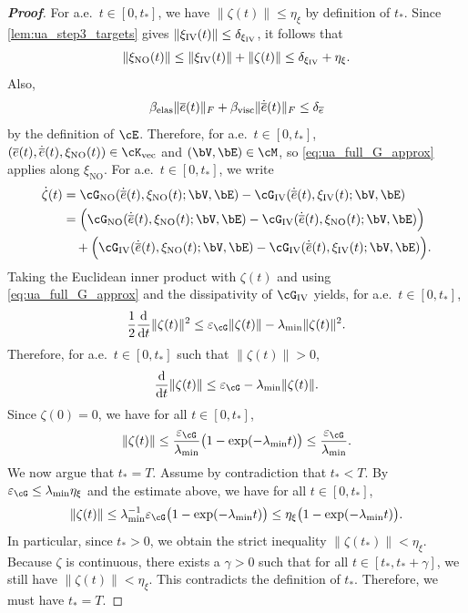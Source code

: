 \begin{proof}[\bf Proof]
For a.e.\ $t\in[0,t_*]$, we have $\|\zeta(t)\|\le \eta_{\xi}$ by definition of $t_*$. Since \cref{lem:ua_step3_targets} gives $\|\xi_{\mathrm{IV}}(t)\|\le \delta_{\xi_{\rm IV}}$, it follows that
\begin{equation*}
\|\xi_{\mathrm{NO}}(t)\|\le \|\xi_{\mathrm{IV}}(t)\|+\|\zeta(t)\|\le \delta_{\xi_{\rm IV}}+\eta_{\xi}.
\end{equation*}
Also,
\begin{equation*}
\beta_{\rm elas}\|\overline e(t)\|_F+\beta_{\rm visc}\|\dot{\overline e}(t)\|_F\le \delta_{\overline e}
\end{equation*}
by the definition of $\cE$. Therefore, for a.e.\ $t\in[0,t_*]$,
$(\overline e(t),\dot{\overline e}(t),\xi_{\mathrm{NO}}(t))\in\cK_{\mathrm{vec}}$ and $(\bV,\bE)\in\cM$, so \cref{eq:ua_full_G_approx} applies along $\xi_{\mathrm{NO}}$.
For a.e.\ $t\in[0,t_*]$, we write
\begin{align*}
\dot\zeta(t)
&=
\cG_{\mathrm{NO}}(\dot{\overline e}(t),\xi_{\mathrm{NO}}(t);\bV,\bE)
-\cG_{\mathrm{IV}}(\dot{\overline e}(t),\xi_{\mathrm{IV}}(t);\bV,\bE)\\
&=
\Big(\cG_{\mathrm{NO}}(\dot{\overline e}(t),\xi_{\mathrm{NO}}(t);\bV,\bE)
-\cG_{\mathrm{IV}}(\dot{\overline e}(t),\xi_{\mathrm{NO}}(t);\bV,\bE)\Big)\\
&\quad+
\Big(\cG_{\mathrm{IV}}(\dot{\overline e}(t),\xi_{\mathrm{NO}}(t);\bV,\bE)
-\cG_{\mathrm{IV}}(\dot{\overline e}(t),\xi_{\mathrm{IV}}(t);\bV,\bE)\Big).
\end{align*}
Taking the Euclidean inner product with $\zeta(t)$ and using \cref{eq:ua_full_G_approx} and the dissipativity of $\cG_{\mathrm{IV}}$ yields, for a.e.\ $t\in[0,t_*]$,
\begin{equation*}
\frac{1}{2}\frac{\mathrm{d}}{\mathrm{d}t}\|\zeta(t)\|^2
\le \varepsilon_{\cG}\|\zeta(t)\| - \lambda_{\min}\|\zeta(t)\|^2.
\end{equation*}
Therefore, for a.e.\ $t\in[0,t_*]$ such that $\|\zeta(t)\|>0$,
\begin{equation*}
\frac{\mathrm{d}}{\mathrm{d}t}\|\zeta(t)\|\le \varepsilon_{\cG}-\lambda_{\min}\|\zeta(t)\|.
\end{equation*}
Since $\zeta(0)=0$, we have for all $t\in[0,t_*]$,
\begin{equation*}
\|\zeta(t)\|\le \frac{\varepsilon_{\cG}}{\lambda_{\min}}\big(1-\exp(-\lambda_{\min}t)\big)\le \frac{\varepsilon_{\cG}}{\lambda_{\min}}.
\end{equation*}
We now argue that $t_*=T$. Assume by contradiction that $t_*<T$. By $\varepsilon_{\cG}\leq \lambda_{\min}\eta_{\xi}$ and the estimate above, we have for all $t\in[0,t_*]$,
\begin{equation*}
\|\zeta(t)\|\le \lambda_{\min}^{-1}\varepsilon_{\cG}\big(1-\exp(-\lambda_{\min}t)\big)\le \eta_{\xi}\big(1-\exp(-\lambda_{\min}t)\big).
\end{equation*}
In particular, since $t_*>0$, we obtain the strict inequality $\|\zeta(t_*)\|<\eta_{\xi}$. Because $\zeta$ is continuous, there exists a $\gamma > 0$ such that for all $t \in [t_*, t_*+\gamma]$, we still have $\|\zeta(t)\|<\eta_{\xi}$. This contradicts the definition of $t_*$. Therefore, we must have $t_*=T$.


\end{proof}
